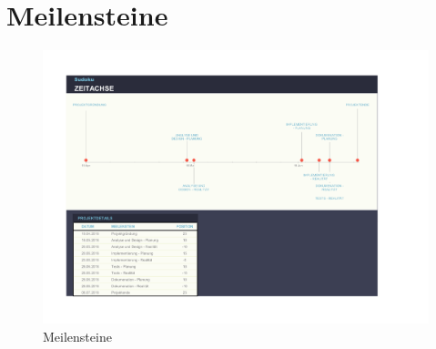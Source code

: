 \chapter{Meilensteine}

\begin{figure}[!htbp]
  \centering
     \includegraphics[keepaspectratio=true,
     scale=0.65,angle={90}]{Graphics/Meilensteine.pdf}
  \caption{Meilensteine}
  \label{fig:meilensteine}
\end{figure}